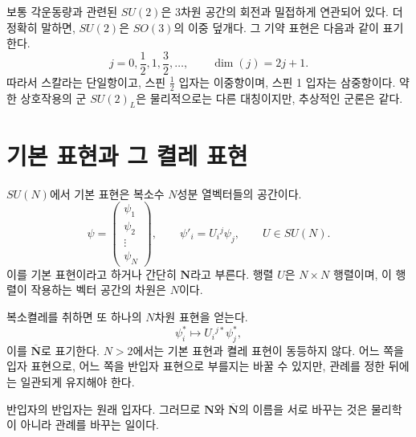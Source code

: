보통 각운동량과 관련된 \(SU(2)\)은 3차원 공간의 회전과 밀접하게 연관되어 있다. 더 정확히 말하면, \(SU(2)\)은 \(SO(3)\)의 이중 덮개다. 그 기약 표현은 다음과 같이 표기한다.
\begin{equation}
j=0,\frac12,1,\frac32,\ldots,
\qquad
\dim(j)=2j+1.
\label{eq:l10-su2-spins}
\end{equation}
따라서 스칼라는 단일항이고, 스핀 \(\tfrac12\) 입자는 이중항이며, 스핀 1 입자는 삼중항이다. 약한 상호작용의 군 \(SU(2)_L\)은 물리적으로는 다른 대칭이지만, 추상적인 군론은 같다.

\section{기본 표현과 그 켤레 표현}

\(SU(N)\)에서 기본 표현은 복소수 \(N\)성분 열벡터들의 공간이다.
\begin{equation}
\psi=
\begin{pmatrix}
\psi_1\\
\psi_2\\
\vdots\\
\psi_N
\end{pmatrix},
\qquad
\psi'_i=U_i{}^j\psi_j,
\qquad
U\in SU(N).
\label{eq:l10-defining}
\end{equation}
이를 기본 표현이라고 하거나 간단히 \(\mathbf N\)라고 부른다. 행렬 \(U\)은 \(N\times N\) 행렬이며, 이 행렬이 작용하는 벡터 공간의 차원은 \(N\)이다.

복소켤레를 취하면 또 하나의 \(N\)차원 표현을 얻는다.
\begin{equation}
\psi_i^*\longmapsto U_i{}^{j*}\psi_j^*,
\label{eq:l10-conjugate}
\end{equation}
이를 \(\overline{\mathbf N}\)로 표기한다. \(N>2\)에서는 기본 표현과 켤레 표현이 동등하지 않다. 어느 쪽을 입자 표현으로, 어느 쪽을 반입자 표현으로 부를지는 바꿀 수 있지만, 관례를 정한 뒤에는 일관되게 유지해야 한다.

\begin{classroomqa}
\end{classroomqa}

반입자의 반입자는 원래 입자다. 그러므로 \(\mathbf N\)와 \(\overline{\mathbf N}\)의 이름을 서로 바꾸는 것은 물리학이 아니라 관례를 바꾸는 일이다.

